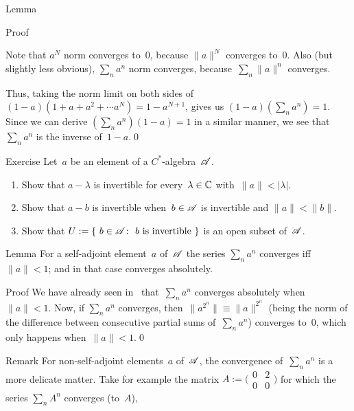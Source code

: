 \documentclass[a]{subfiles}
\begin{document}
\begin{parsec}
\begin{point}[geometric]{Lemma}
\begin{point}{Proof}
\begin{point}%
Note that $a^N$ norm converges to~$0$,
because $\|a\|^N$ converges to~$0$.
Also (but slightly less obvious),
$\sum_n a^n$ norm converges,
because~$\sum_n \|a\|^n$ converges.
\end{point}
\begin{point}%
Thus, taking the norm limit
on both sides of $(1-a)(1+a+a^2+\dotsb a^N) = 1-a^{N+1}$,
gives us $(1-a)(\sum_n a^n) = 1$.
Since we can derive $(\sum_n a^n)(1-a) = 1$
in a similar manner, 
we see that $\sum_n a^n$ is the inverse of~$1-a$.\qed
\end{point}
\end{point}
\end{point}
\begin{point}{Exercise}%
%
Let~$a$ be an element of a $C^*$-algebra~$\mathscr{A}$.
\begin{enumerate}
\item
Show that $a-\lambda$ is invertible
for every~$\lambda\in\mathbb{C}$ with~$\|a\|< \left|\lambda\right|$.
\item
Show that $a-b$ is invertible
when~$b\in\mathscr{A}$ is invertible and $\|a\| < \|b\|$.
\item
Show that $U:=\{\ b\in\scrA\colon\ \text{$b$ is invertible}\ \}$
is an open subset of~$\mathscr{A}$.
\end{enumerate}
\end{point}
\begin{point}{Lemma}%
%
For a self-adjoint element~$a$ of~$\mathscr{A}$
the series $\sum_n a^n$ 
converges iff~$\|a\|<1$;
and in that case converges absolutely.
\begin{point}{Proof}%
We have already seen in~
that~$\sum_n a^n$
converges absolutely when~$\|a\|<1$.
Now, if $\sum_n a^n$ converges,
then~$\|a^{2^n}\|\equiv \|a\|^{2^n}$
(being the norm of the difference
between consecutive partial sums of~$\sum_n a^n$)
converges to~$0$,
which only happens when~$\|a\|<1$.\qed
\end{point}
\begin{point}{Remark}%
For non-self-adjoint elements~$a$ of~$\mathscr{A}$,
the convergence of~$\sum_n a^n$
is a more delicate matter.
Take for example
the matrix $A:=\bigl(\begin{smallmatrix}0&2\\0&0\end{smallmatrix}\bigr)$
for which the series $\sum_n A^n$ converges (to~$A$),

\end{point}
\end{point}
\end{parsec}
\end{document}
